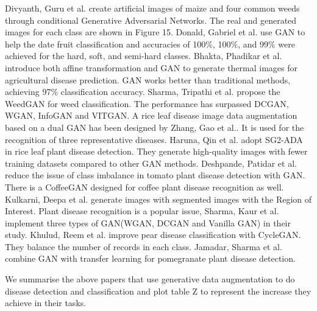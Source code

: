 \documentclass[preprint,12pt,authoryear]{elsarticle}
\begin{document}
Divyanth, Guru et al. create artificial images of maize and four common weeds through conditional Generative Adversarial Networks\cite{apl36}. The real and generated images for each class are shown in Figure 15. Donald, Gabriel et al. use GAN to help the date fruit classification and accuracies of 100\%, 100\%, and 99\% were achieved for the hard, soft, and semi-hard classes\cite{apl37}. Bhakta, Phadikar et al. introduce both affine transformation and GAN to generate thermal images for agricultural disease prediction. GAN works better than traditional methods, achieving 97\% classification accuracy\cite{apl38}. Sharma, Tripathi et al. propose the WeedGAN for weed classification\cite{apl39}. The performance has surpassed DCGAN, WGAN, InfoGAN and VITGAN. A rice leaf disease image data augmentation based on a dual GAN has been designed by Zhang, Gao et al.\cite{apl40}. It is used for the recognition of three representative diseases. Haruna, Qin et al. adopt SG2-ADA in rice leaf plant disease detection\cite{apl46}. They generate high-quality images with fewer training datasets compared to other GAN methods. Deshpande, Patidar et al. reduce the issue of class imbalance in tomato plant disease detection with GAN\cite{apl41}. There is a CoffeeGAN designed for coffee plant disease recognition as well\cite{apl42}. Kulkarni, Deepa et al. generate images with segmented images with the Region of Interest. Plant disease recognition is a popular issue, Sharma, Kaur et al. implement three types of GAN(WGAN, DCGAN and Vanilla GAN) in their study\cite{apl43}. Khulud, Reem et al. improve pear disease classification with CycleGAN\cite{apl44}. They balance the number of records in each class. Jamadar, Sharma et al. combine GAN with transfer learning for pomegranate plant disease detection\cite{apl45}. 

We summarise the above papers that use generative data augmentation to do disease detection and classification and plot table Z to represent the increase they achieve in their tasks.
\end{document}
